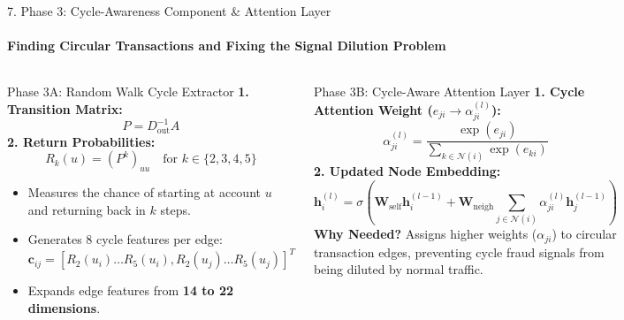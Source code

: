 \documentclass[aspectratio=169, 11pt]{beamer}
\begin{document}
\begin{frame}{7. Phase 3: Cycle-Awareness Component \& Attention Layer}
    \framesubtitle{Finding Circular Transactions and Fixing the Signal Dilution Problem}
    \begin{columns}[T]
        \begin{block}{Phase 3A: Random Walk Cycle Extractor}
            \scriptsize
            \textbf{1. Transition Matrix:}
            $$P = D_{\text{out}}^{-1} A$$
            \textbf{2. Return Probabilities:}
            $$R_k(u) = (P^k)_{uu} \quad \text{for } k \in \{2, 3, 4, 5\}$$
            \begin{itemize}\setlength{\itemsep}{1pt}
                \item Measures the chance of starting at account $u$ and returning back in $k$ steps.
                \item Generates 8 cycle features per edge:
                $$\mathbf{c}_{ij} = [R_2(u_i)\dots R_5(u_i), R_2(u_j)\dots R_5(u_j)]^T$$
                \item Expands edge features from \textbf{14 to 22 dimensions}.
            \end{itemize}
        \end{block}

        \begin{block}{Phase 3B: Cycle-Aware Attention Layer}
            \scriptsize
            \textbf{1. Cycle Attention Weight ($e_{ji} \to \alpha_{ji}^{(l)}$):}
            \vspace{-0.15cm}
            \vspace{-0.15cm}
            $$\alpha_{ji}^{(l)} = \frac{\exp(e_{ji})}{\sum_{k \in \mathcal{N}(i)} \exp(e_{ki})}$$
            \vspace{-0.15cm}
            \textbf{2. Updated Node Embedding:}
            \vspace{-0.15cm}
            $$\mathbf{h}_i^{(l)} = \sigma\left(\mathbf{W}_{\text{self}} \mathbf{h}_i^{(l-1)} + \mathbf{W}_{\text{neigh}} \sum_{j \in \mathcal{N}(i)} \alpha_{ji}^{(l)} \mathbf{h}_j^{(l-1)}\right)$$
            \vspace{-0.15cm}
            \textbf{Why Needed?} Assigns higher weights ($\alpha_{ji}$) to circular transaction edges, preventing cycle fraud signals from being diluted by normal traffic.
        \end{block}
    \end{columns}
\end{frame}
\end{document}
